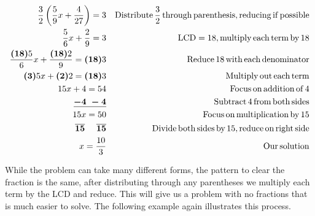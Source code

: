 \begin{example}\label{Lin32}
  \begin{eqnarray*}
    \frac{3}{2} \left( \frac{5}{9} x + \frac{4}{27} \right) = 3 &  &
    \operatorname{Distribute} \frac{3}{2} \operatorname{through} \operatorname{parenthesis},
    \operatorname{reducing} \operatorname{if} \operatorname{possible}\\
    \frac{5}{6} x + \frac{2}{9} = 3 &  & \operatorname{LCD} = 18, \operatorname{multiply}
    \operatorname{each} \operatorname{term} \operatorname{by} 18\\
    \frac{\boldsymbol{(18)} 5}{6} x + \frac{\boldsymbol{(18)} 2}{9} =
    \boldsymbol{(18)} 3 &  & \operatorname{Reduce} 18 \operatorname{with} \operatorname{each}
    \operatorname{denominator}\\
    \boldsymbol{(3)} 5 x + \boldsymbol{(2)} 2 = \boldsymbol{(18)} 3 &  &
    \operatorname{Multiply} \operatorname{out} \operatorname{each} \operatorname{term}\\
    15 x + 4 = 54 &  & \operatorname{Focus} \operatorname{on} \operatorname{addition} \operatorname{of} 4\\
    \underline{\boldsymbol{- 4 ~- 4}} &  & \operatorname{Subtract} 4 \operatorname{from}
    \operatorname{both} \operatorname{sides}\\
    15 x = 50 &  & \operatorname{Focus} \operatorname{on} \operatorname{multiplication} \operatorname{by} 15\\
     \boldsymbol{\overline{15} ~~~~ \overline{15}} &  & \operatorname{Divide} \operatorname{both}
    \operatorname{sides} \operatorname{by} 15, \operatorname{reduce} \operatorname{on} \operatorname{right}
    \operatorname{side}\\
    x = \frac{10}{3} &  & \operatorname{Our} \operatorname{solution}
  \end{eqnarray*}
\end{example}

 While the problem can take many different forms, the pattern to clear the
fraction is the same, after distributing through any parentheses we multiply
each term by the LCD and reduce. This will give us a problem with no fractions
that is much easier to solve. The following example again illustrates this
process.

